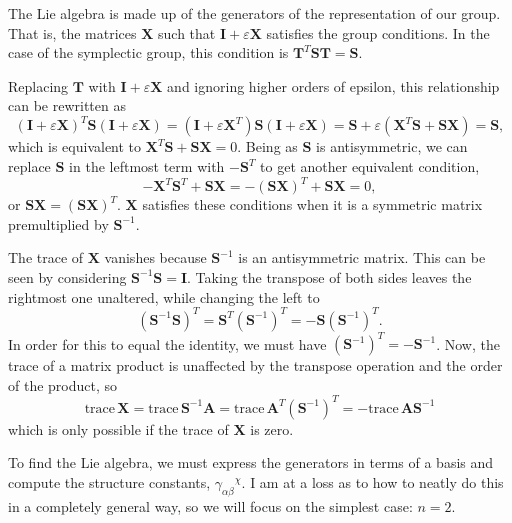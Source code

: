 \documentclass[../the-road-to-reality.tex]{subfiles}
\begin{document}
\begin{questions}
\begin{solution}
	The Lie algebra is made up of the generators of the representation of our group. That is, the matrices $\mathbf{X}$ such that $\mathbf{I} + \varepsilon\mathbf{X}$ satisfies the group conditions. In the case of the symplectic group, this condition is $\mathbf{T}^T\mathbf{ST}=\mathbf{S}$.		

	Replacing $\mathbf{T}$ with $\mathbf{I} + \varepsilon\mathbf{X}$ and ignoring higher orders of epsilon, this relationship can be rewritten as
	\[
	(\mathbf{I} + \varepsilon\mathbf{X})^T\mathbf{S}(\mathbf{I} + \varepsilon\mathbf{X}) = (\mathbf{I} + \varepsilon\mathbf{X}^T)\mathbf{S}(\mathbf{I} + \varepsilon\mathbf{X}) = \mathbf{S} + \varepsilon(\mathbf{X}^T\mathbf{S} + \mathbf{S}\mathbf{X}) = \mathbf{S},
	\] 
	which is equivalent to $\mathbf{X}^T\mathbf{S} + \mathbf{SX} = 0$. Being as $\mathbf{S}$ is antisymmetric, we can replace $\mathbf{S}$ in the leftmost term with $-\mathbf{S}^T$ to get another equivalent condition,
	\[
		-\mathbf{X}^T\mathbf{S}^T + \mathbf{SX} = -(\mathbf{SX})^T + \mathbf{SX} = 0,
	\] 
	or $\mathbf{SX} = (\mathbf{SX})^T$. $\mathbf{X}$ satisfies these conditions when it is a symmetric matrix premultiplied by $\mathbf{S}^{-1}$.

	The trace of $\mathbf{X}$ vanishes because $\mathbf{S}^{-1}$ is an antisymmetric matrix. This can be seen by considering $\mathbf{S}^{-1}\mathbf{S} = \mathbf{I}$. Taking the transpose of both sides leaves the rightmost one unaltered, while changing the left to
	\[
		(\mathbf{S}^{-1}\mathbf{S})^T = \mathbf{S}^T(\mathbf{S}^{-1})^T = -\mathbf{S}(\mathbf{S}^{-1})^T
	.\] 
	In order for this to equal the identity, we must have $(\mathbf{S}^{-1})^T = -\mathbf{S}^{-1}$. Now, the trace of a matrix product is unaffected by the transpose operation and the order of the product, so 
	\[
		\mathrm{trace}\,\mathbf{X} = \mathrm{trace}\,\mathbf{S}^{-1}\mathbf{A} = \mathrm{trace}\,\mathbf{A}^T(\mathbf{S}^{-1})^T = -\mathrm{trace}\,\mathbf{A}\mathbf{S}^{-1}
	\] 
	which is only possible if the trace of $\mathbf{X}$ is zero.
	
	To find the Lie algebra, we must express the generators in terms of a basis and compute the structure constants, ${\gamma_{\alpha\beta}}^\chi$. I am at a loss as to how to neatly do this in a completely general way, so we will focus on the simplest case: $n=2$.


\end{solution}
\end{questions}
\end{document}
